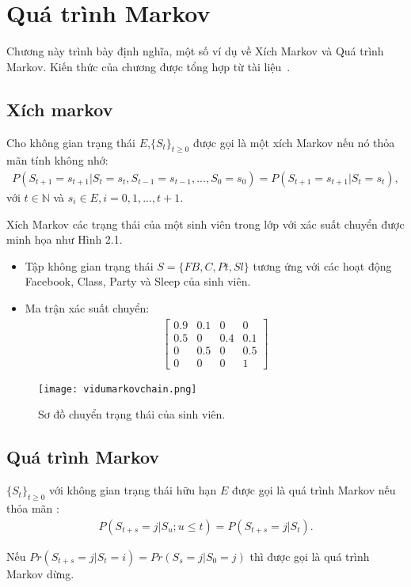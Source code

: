 \chapter{Quá trình Markov}
\label{ch:02}
	Chương này trình bày định nghĩa, một số ví dụ về Xích Markov và Quá trình Markov. Kiến thức của chương được tổng hợp từ tài liệu~\cite{Gagniuc2017}.
\section{Xích markov}
\begin{dn} \rm
Cho không gian trạng thái $E$,$\lbrace S_{t}\rbrace _{t\geq 0}$ được gọi là một xích Markov nếu nó thỏa mãn tính không nhớ:
\begin{align}
P(S_{t+1}=s_{t+1}|S_{t}=s_{t},S_{t-1}=s_{t-1},...,S_{0}=s_{0}) = P(S_{t+1}=s_{t+1}|S_{t}=s_{t}),
\end{align}
với $t\in \mathbb{N}$ và $s_{i} \in E, i = 0,1,...,t+1.$
\end{dn}

\begin{vd}
Xích Markov các trạng thái của một sinh viên trong lớp với xác suất chuyển được minh họa như Hình 2.1. 
\begin{itemize}
\item Tập không gian trạng thái $S = \lbrace FB,C,Pt,Sl \rbrace $ tương ứng với các hoạt động Facebook, Class, Party và Sleep của sinh viên.
\item Ma trận xác suất chuyển:
\begin{align*}
\begin{bmatrix}
0.9&  0.1&  0& 0\\ 
0.5&  0&  0.4& 0.1\\ 
0&  0.5& 0 & 0.5\\ 
0 & 0 & 0 & 1
\end{bmatrix}
\end{align*}
\end{itemize}
\newpage
\begin{figure}[ht] {\label{h2.1}}
    \centering
    \texttt{[image: vidumarkovchain.png]}
    \caption{Sơ đồ chuyển trạng thái của sinh viên.}
    \label{fig:tactumoitruong}
\end{figure}
\end{vd}
\section{Quá trình Markov}
\begin{dn} \rm
$\lbrace S_{t}\rbrace _{t\geq 0}$ với không gian trạng thái hữu hạn $E$ được gọi là quá trình Markov nếu thỏa mãn :
\begin{align}
P(S_{t+s}=j|S_{u};u\leq t)=P(S_{t+s}=j|S_{t}).
\end{align}
\end{dn}
\begin{nx} \rm
Nếu $Pr(S_{t+s}=j|S_{t}=i)=Pr(S_{s}=j|S_{0}=j)$ thì được gọi là quá trình Markov dừng.
\end{nx}